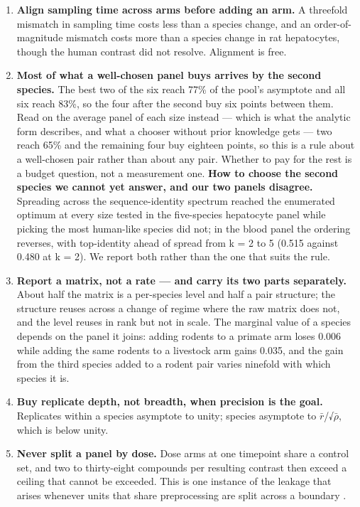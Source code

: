 \documentclass[11pt,a4paper]{article}
\providecommand{\tightlist}{\setlength{\itemsep}{3pt}\setlength{\parskip}{0pt}}
\begin{document}
\begin{enumerate}
\def\labelenumi{\arabic{enumi}.}
\tightlist
\item
  \textbf{Align sampling time across arms before adding an arm.} A
  threefold mismatch in sampling time costs less than a species change,
  and an order-of-magnitude mismatch costs more than a species change in
  rat hepatocytes, though the human contrast did not resolve. Alignment
  is free.
\item
  \textbf{Most of what a well-chosen panel buys arrives by the second
  species.} The best two of the six reach 77\% of the pool's asymptote
  and all six reach 83\%, so the four after the second buy six points
  between them. Read on the average panel of each size instead --- which
  is what the analytic form describes, and what a chooser without prior
  knowledge gets --- two reach 65\% and the remaining four buy eighteen
  points, so this is a rule about a well-chosen pair rather than about
  any pair. Whether to pay for the rest is a budget question, not a
  measurement one. \textbf{How to choose the second species we cannot
  yet answer, and our two panels disagree.} Spreading across the
  sequence-identity spectrum reached the enumerated optimum at every
  size tested in the five-species hepatocyte panel while picking the
  most human-like species did not; in the blood panel the ordering
  reverses, with top-identity ahead of spread from k = 2 to 5 (0.515
  against 0.480 at k = 2). We report both rather than the one that suits
  the rule.
\item
  \textbf{Report a matrix, not a rate --- and carry its two parts
  separately.} About half the matrix is a per-species level and half a
  pair structure; the structure reuses across a change of regime where
  the raw matrix does not, and the level reuses in rank but not in
  scale. The marginal value of a species depends on the panel it joins:
  adding rodents to a primate arm loses 0.006 while adding the same
  rodents to a livestock arm gains 0.035, and the gain from the third
  species added to a rodent pair varies ninefold with which species it
  is.
\item
  \textbf{Buy replicate depth, not breadth, when precision is the goal.}
  Replicates within a species asymptote to unity; species asymptote to
  \ensuremath{\bar{r}}/√\ensuremath{\bar{\rho}}, which is below unity.
\item
  \textbf{Never split a panel by dose.} Dose arms at one timepoint share
  a control set, and two to thirty-eight compounds per resulting
  contrast then exceed a ceiling that cannot be exceeded. This is one
  instance of the leakage that arises whenever units that share
  preprocessing are split across a boundary \cite{ref55}.
\end{enumerate}
\end{document}
